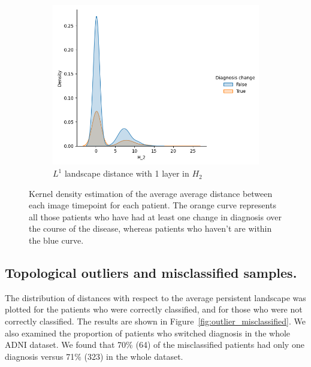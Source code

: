 \documentclass{article}
\begin{document}
\begin{figure}
\begin{subfigure}{0.32\textwidth}
    \includegraphics[width=\textwidth]{figures/temporal_evolution/landscape_H_2_dist_diag_change.png}
    \caption{$L^{1}$ landscape distance with 1 layer in $H_2$}
  \end{subfigure}
  \caption{Kernel density estimation of the average average distance between each image timepoint for each patient. The orange curve represents all those patients who have had at least one change in diagnosis over the course of the disease, whereas patients who haven't are within the blue curve.}
  \label{fig:kde_intra_patient}
\end{figure}

\subsection{Topological outliers and misclassified samples.}

The distribution of distances with respect to the average persistent landscape was plotted for the patients who were correctly classified, and for those who were not correctly classified. The results are shown in Figure~\ref{fig:outlier_misclassified}. We also examined the proportion of patients who switched diagnosis in the whole ADNI dataset. We found that 70\% (64) of the misclassified patients had only one diagnosis versus 71\% (323) in the whole dataset.
\end{document}

